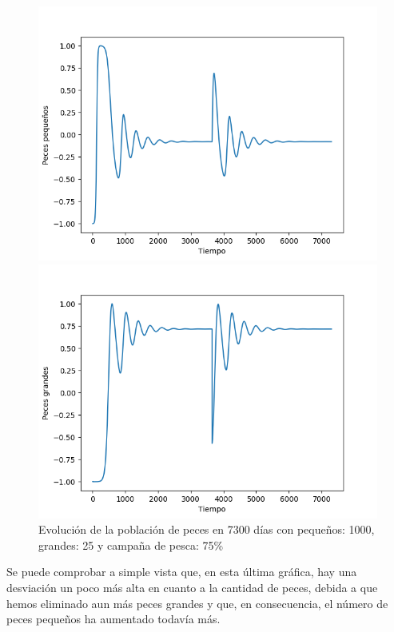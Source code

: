 \documentclass[11pt,a4paper]{report}
\begin{document}
\begin{figure}[H]
	\begin{minipage}{0.5\textwidth}
	  \centering
	  \includegraphics[scale=0.45]{img/pequenios-4000-25-pesca75.png}
	\end{minipage}
	\begin{minipage}{0.5\textwidth}
	  \centering
	  \includegraphics[scale=0.45]{img/grandes-4000-25-pesca75.png}
	\end{minipage}
	\caption{Evolución de la población de peces en 7300 días con pequeños: 1000, grandes: 25 y campaña de pesca: 75\%}
\end{figure}

Se puede comprobar a simple vista que, en esta última gráfica, hay una desviación un poco más alta en cuanto a la cantidad de peces, debida a
que hemos eliminado aun más peces grandes y que, en consecuencia, el número de peces pequeños ha aumentado todavía más.
\end{document}
